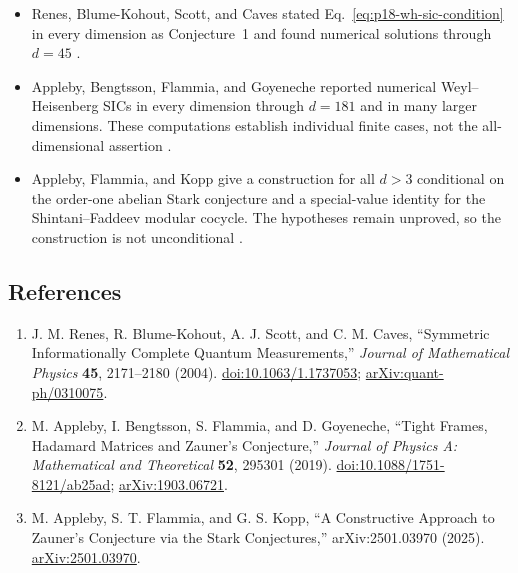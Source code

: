 \begin{itemize}
  \item Renes, Blume-Kohout, Scott, and Caves stated
  Eq.~\eqref{eq:p18-wh-sic-condition} in every dimension as Conjecture~1 and
  found numerical solutions through $d=45$
  .

  \item Appleby, Bengtsson, Flammia, and Goyeneche reported numerical
  Weyl--Heisenberg SICs in every dimension through $d=181$ and in many larger
  dimensions.  These computations establish individual finite cases, not the
  all-dimensional assertion
  .

  \item Appleby, Flammia, and Kopp give a construction for all $d>3$
  conditional on the order-one abelian Stark conjecture and a special-value
  identity for the Shintani--Faddeev modular cocycle.  The hypotheses remain
  unproved, so the construction is not unconditional
  .
\end{itemize}

\subsection*{References}

\begin{enumerate}[label={},leftmargin=4.8em,labelsep=0.5em]
  \footnotesize
  \item[\textup{[RBS+04]}]\label{ref:p18-renes}
  J. M. Renes, R. Blume-Kohout, A. J. Scott, and C. M. Caves,
  ``Symmetric Informationally Complete Quantum Measurements,''
  \emph{Journal of Mathematical Physics} \textbf{45}, 2171--2180 (2004).
  \href{https://doi.org/10.1063/1.1737053}{doi:10.1063/1.1737053};
  \href{https://arxiv.org/abs/quant-ph/0310075}{arXiv:quant-ph/0310075}.

  \item[\textup{[ABFG19]}]\label{ref:p18-appleby-data}
  M. Appleby, I. Bengtsson, S. Flammia, and D. Goyeneche,
  ``Tight Frames, Hadamard Matrices and Zauner's Conjecture,''
  \emph{Journal of Physics A: Mathematical and Theoretical} \textbf{52},
  295301 (2019).
  \href{https://doi.org/10.1088/1751-8121/ab25ad}{doi:10.1088/1751-8121/ab25ad};
  \href{https://arxiv.org/abs/1903.06721}{arXiv:1903.06721}.

  \item[\textup{[AFK25]}]\label{ref:p18-appleby-stark}
  M. Appleby, S. T. Flammia, and G. S. Kopp,
  ``A Constructive Approach to Zauner's Conjecture via the Stark
  Conjectures,'' arXiv:2501.03970 (2025).
  \href{https://arxiv.org/abs/2501.03970}{arXiv:2501.03970}.
\end{enumerate}

